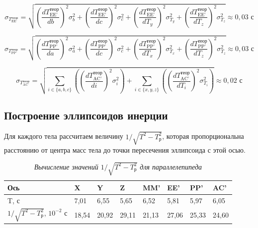 \documentclass[a4paper, 12pt]{article}
\begin{document}
\begin{equation}
    \sigma_{T_{\text{EE'}}^\text{теор}} = \sqrt{
    \left( \frac{dT_{\text{EE'}}^\text{теор}}{db} \right) ^ 2 \sigma_{b}^2 + 
    \left( \frac{dT_{\text{EE'}}^\text{теор}}{dc} \right) ^ 2 \sigma_{c}^2 + 
    \left( \frac{dT_{\text{EE'}}^\text{теор}}{dT_{y}} \right) ^ 2 \sigma_{T_{y}}^2 + 
    \left( \frac{dT_{\text{EE'}}^\text{теор}}{dT_{z}} \right) ^ 2 \sigma_{T_{z}}^2
    } \approx 0,03 \text{ с}
\end{equation}

\begin{equation}
    \sigma_{T_{\text{PP'}}^\text{теор}} = \sqrt{
    \left( \frac{dT_{\text{PP'}}^\text{теор}}{da} \right) ^ 2 \sigma_{a}^2 + 
    \left( \frac{dT_{\text{PP'}}^\text{теор}}{dc} \right) ^ 2 \sigma_{c}^2 + 
    \left( \frac{dT_{\text{PP'}}^\text{теор}}{dT_{x}} \right) ^ 2 \sigma_{T_{x}}^2 + 
    \left( \frac{dT_{\text{PP'}}^\text{теор}}{dT_{z}} \right) ^ 2 \sigma_{T_{z}}^2
    } \approx 0,03 \text{ с}
\end{equation}

\begin{equation}
    \sigma_{T_{\text{AC'}}^\text{теор}} = \sqrt{
    \sum_{i \in \{a, b, c\}} \left( \left( \frac{dT_{\text{AC'}}^\text{теор}}{di} \right) ^ 2 \sigma_{i}^2 \right) + 
    \sum_{i \in \{x, y, z\}} \left( \left( \frac{dT_{\text{AC'}}^\text{теор}}{dT_{i}} \right) ^ 2 \sigma_{T_{i}}^2 \right)
    } \approx 0,02 \text{ с}
\end{equation}

\subsection{Построение эллипсоидов инерции}

Для каждого тела рассчитаем величину $1 / \sqrt{T^2 - T^2_\text{р}}$, которая пропорциональна расстоянию от центра масс тела до точки пересечения эллипсоида с этой осью.

\begin{table}[!ht]
    \centering
    \begin{tabular}{|l|l|l|l|l|l|l|l|}
    \hline
        Ось & X & Y & Z & MM’ & EE’ & PP’ & AC’ \\ \hline
        T, с & 7,01 & 6,55 & 5,65 & 6,52 & 5,81 & 5,97 & 6,05 \\ \hline
        $1 / \sqrt{T^2 - T^2_\text{р}}$, $10^{-2} \text{ с}$ & 18,54 & 20,92 & 29,11 & 21,13 & 27,06 & 25,33 & 24,60 \\ \hline
    \end{tabular}\caption{\textit{Вычисление значений $1 / \sqrt{T^2 - T^2_\text{р}}$ для параллелепипеда}}
\end{table}
\end{document}
